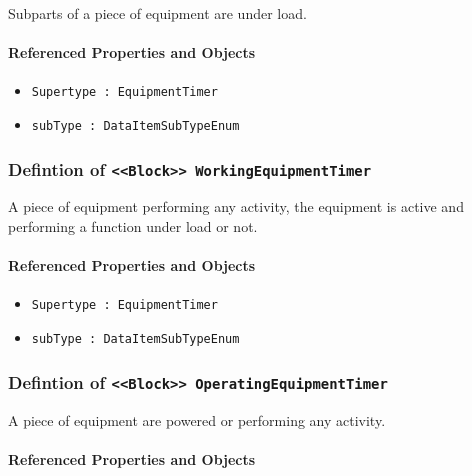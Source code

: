 \FloatBarrier

Subparts of a piece of equipment are under load.

\FloatBarrier
\paragraph{Referenced Properties and Objects}

\begin{itemize}
\item \texttt{Supertype : EquipmentTimer}

\item \texttt{subType : DataItemSubTypeEnum}

\end{itemize}
\FloatBarrier
\subsubsection{Defintion of \texttt{<<Block>> WorkingEquipmentTimer}}
  \label{type:WorkingEquipmentTimer}

\FloatBarrier

A piece of equipment performing any activity, the equipment is active and performing a function under load or not.

\FloatBarrier
\paragraph{Referenced Properties and Objects}

\begin{itemize}
\item \texttt{Supertype : EquipmentTimer}

\item \texttt{subType : DataItemSubTypeEnum}

\end{itemize}
\FloatBarrier
\subsubsection{Defintion of \texttt{<<Block>> OperatingEquipmentTimer}}
  \label{type:OperatingEquipmentTimer}

\FloatBarrier

A piece of equipment are powered or performing any activity.

\FloatBarrier
\paragraph{Referenced Properties and Objects}

